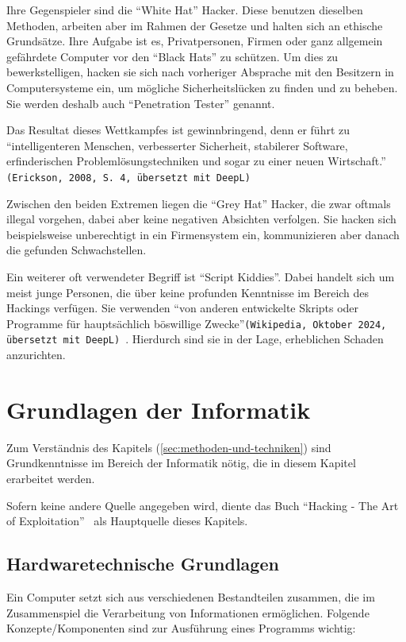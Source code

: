 \documentclass[11pt, a4paper]{article}
\begin{document}
Ihre Gegenspieler sind die ``White Hat'' Hacker. Diese benutzen dieselben Methoden, arbeiten aber im Rahmen der Gesetze und halten sich an ethische Grundsätze. Ihre Aufgabe ist es, Privatpersonen, Firmen oder ganz allgemein gefährdete Computer vor den ``Black Hats'' zu schützen. Um dies zu bewerkstelligen, hacken sie sich nach vorheriger Absprache mit den Besitzern in Computersysteme ein, um mögliche Sicherheitslücken zu finden und zu beheben. Sie werden deshalb auch ``Penetration Tester'' genannt.

Das Resultat dieses Wettkampfes ist gewinnbringend, denn er führt zu ``intelligenteren Menschen, verbesserter Sicherheit, stabilerer Software, erfinderischen Problemlösungstechniken und sogar zu einer neuen Wirtschaft.'' \texttt{(Erickson, 2008, S. 4, übersetzt mit DeepL)} \cite{erickson2008hacking}

Zwischen den beiden Extremen liegen die ``Grey Hat'' Hacker, die zwar oftmals illegal vorgehen, dabei aber keine negativen Absichten verfolgen. Sie hacken sich beispielsweise unberechtigt in ein Firmensystem ein, kommunizieren aber danach die gefunden Schwachstellen. \cite{WhiteHatBlackHat:paper, BlackHat34:online}

Ein weiterer oft verwendeter Begriff ist ``Script Kiddies''. Dabei handelt sich um meist junge Personen, die über keine profunden Kenntnisse im Bereich des Hackings verfügen. Sie verwenden ``von anderen entwickelte Skripts oder Programme für hauptsächlich böswillige Zwecke''\texttt{(Wikipedia, Oktober 2024, übersetzt mit DeepL)}~\cite{ScriptkiWikipedia:online}. Hierdurch sind sie in der Lage, erheblichen Schaden anzurichten.~\cite{ScriptkiWikipedia:online}

\newpage
\section{Grundlagen der Informatik}\label{sec:grundlagen-der-informatik}
Zum Verständnis des Kapitels  (\ref{sec:methoden-und-techniken}) sind Grundkenntnisse im Bereich der Informatik nötig, die in diesem Kapitel erarbeitet werden.

Sofern keine andere Quelle angegeben wird, diente das Buch ``Hacking - The Art of Exploitation''~\cite{erickson2008hacking} als Hauptquelle dieses Kapitels.
\subsection{Hardwaretechnische Grundlagen}
Ein Computer setzt sich aus verschiedenen Bestandteilen zusammen, die im Zusammenspiel die Verarbeitung von Informationen ermöglichen. Folgende Konzepte/Komponenten sind zur Ausführung eines Programms wichtig:
\end{document}
